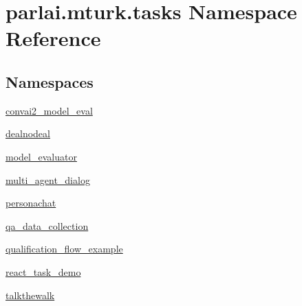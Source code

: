 \hypertarget{namespaceparlai_1_1mturk_1_1tasks}{}\section{parlai.\+mturk.\+tasks Namespace Reference}
\label{namespaceparlai_1_1mturk_1_1tasks}
\subsection*{Namespaces}
\begin{DoxyCompactItemize}
\item 
 \hyperlink{namespaceparlai_1_1mturk_1_1tasks_1_1convai2__model__eval}{convai2\+\_\+model\+\_\+eval}
\item 
 \hyperlink{namespaceparlai_1_1mturk_1_1tasks_1_1dealnodeal}{dealnodeal}
\item 
 \hyperlink{namespaceparlai_1_1mturk_1_1tasks_1_1model__evaluator}{model\+\_\+evaluator}
\item 
 \hyperlink{namespaceparlai_1_1mturk_1_1tasks_1_1multi__agent__dialog}{multi\+\_\+agent\+\_\+dialog}
\item 
 \hyperlink{namespaceparlai_1_1mturk_1_1tasks_1_1personachat}{personachat}
\item 
 \hyperlink{namespaceparlai_1_1mturk_1_1tasks_1_1qa__data__collection}{qa\+\_\+data\+\_\+collection}
\item 
 \hyperlink{namespaceparlai_1_1mturk_1_1tasks_1_1qualification__flow__example}{qualification\+\_\+flow\+\_\+example}
\item 
 \hyperlink{namespaceparlai_1_1mturk_1_1tasks_1_1react__task__demo}{react\+\_\+task\+\_\+demo}
\item 
 \hyperlink{namespaceparlai_1_1mturk_1_1tasks_1_1talkthewalk}{talkthewalk}
\end{DoxyCompactItemize}
